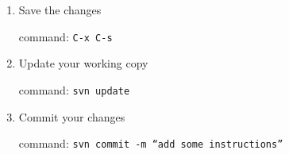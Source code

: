 \documentclass{article}
\begin{document}
\begin{enumerate}
{}


\item{Save the changes

command: \texttt{C-x C-s}}


\item{Update your working copy

command: \texttt{svn update}}


\item{Commit your changes

command: \texttt{svn commit -m ``add some instructions''}}

\end{enumerate}
\end{document}
